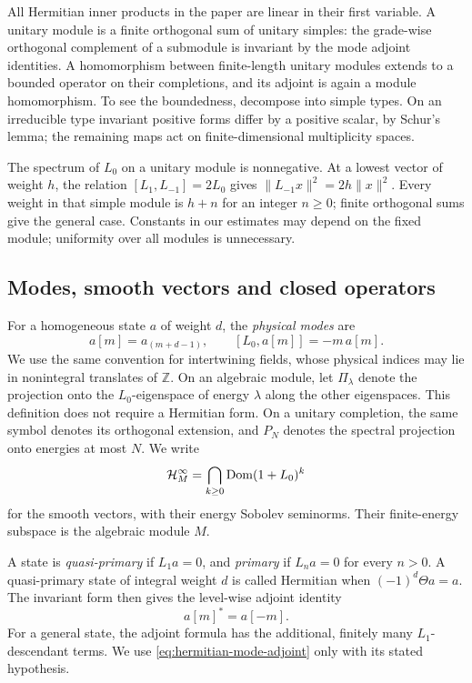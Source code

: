 All Hermitian inner products in the paper are linear in their first variable. A unitary module is a finite orthogonal sum of unitary simples: the grade-wise orthogonal complement of a submodule is invariant by the mode adjoint identities. A homomorphism between finite-length unitary modules extends to a bounded operator on their completions, and its adjoint is again a module homomorphism. To see the boundedness, decompose into simple types. On an irreducible type invariant positive forms differ by a positive scalar, by Schur's lemma; the remaining maps act on finite-dimensional multiplicity spaces.

The spectrum of $L_0$ on a unitary module is nonnegative. At a lowest vector of weight $h$, the relation $[L_1,L_{-1}]=2L_0$ gives $\|L_{-1}x\|^2=2h\|x\|^2$. Every weight in that simple module is $h+n$ for an integer $n\geq0$; finite orthogonal sums give the general case. Constants in our estimates may depend on the fixed module; uniformity over all modules is unnecessary.

\subsection{Modes, smooth vectors and closed operators}

For a homogeneous state $a$ of weight $d$, the \emph{physical modes} are
\begin{equation}\label{eq:physical-modes}
 a[m]=a_{(m+d-1)},\qquad
 [L_0,a[m]]=-m\,a[m].
\end{equation}
We use the same convention for intertwining fields, whose physical indices may lie in nonintegral translates of $\mathbb Z$. On an algebraic module, let $\Pi_\lambda$ denote the projection onto the $L_0$-eigenspace of energy $\lambda$ along the other eigenspaces. This definition does not require a Hermitian form. On a unitary completion, the same symbol denotes its orthogonal extension, and $P_N$ denotes the spectral projection onto energies at most $N$. We write
\[
 \mathcal H_M^\infty
 =\bigcap_{k\geq0}\operatorname{Dom}(1+L_0)^k
\]
for the smooth vectors, with their energy Sobolev seminorms. Their finite-energy subspace is the algebraic module $M$.

A state is \emph{quasi-primary} if $L_1a=0$, and \emph{primary} if $L_na=0$ for every $n>0$. A quasi-primary state of integral weight $d$ is called Hermitian when $(-1)^d\Theta a=a$. The invariant form then gives the level-wise adjoint identity
\begin{equation}\label{eq:hermitian-mode-adjoint}
 a[m]^*=a[-m].
\end{equation}
For a general state, the adjoint formula has the additional, finitely many $L_1$-descendant terms. We use \eqref{eq:hermitian-mode-adjoint} only with its stated hypothesis.

